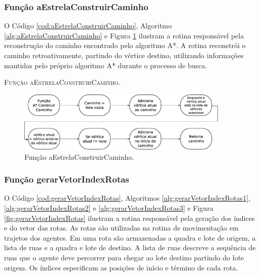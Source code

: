 \newpage

\subsubsection{Função aEstrelaConstruirCaminho}

O Código \ref{cod:aEstrelaConstruirCaminho}, Algoritmo \ref{alg:aEstrelaConstruirCaminho} e Figura \ref{fig:aEstrelaConstruirCaminho} ilustram a rotina responsável pela reconstrução do caminho encontrado pelo algoritmo A*. A rotina reconstrói o caminho retroativamente, partindo do vértice destino, utilizando informações mantidas pelo próprio algoritmo A* durante o processo de busca.



\begin{algorithm}[H]
   \SetAlgoLined
   
   \caption{\textsc{Função aEstrelaConstruirCaminho.}}
   \label{alg:aEstrelaConstruirCaminho}
\end{algorithm}

\begin{figure}[H]
  \centering
  \includegraphics[width=0.9\textwidth]{Figuras/Simula/Fluxos/aEstrelaConstruirCaminho.eps}
  \caption{Função aEstrelaConstruirCaminho.}
  \label{fig:aEstrelaConstruirCaminho}
\end{figure} 

\newpage

\subsubsection{Função gerarVetorIndexRotas}

O Código \ref{cod:gerarVetorIndexRotas}, Algoritmos \ref{alg:gerarVetorIndexRotas1}, \ref{alg:gerarVetorIndexRotas2} e \ref{alg:gerarVetorIndexRotas3} e Figura \ref{fig:gerarVetorIndexRotas} ilustram a rotina responsável pela geração dos índices e do vetor das rotas. As rotas são utilizadas na rotina de movimentação em trajetos dos agentes. Em uma rota são armazenadas a quadra e lote de origem, a lista de ruas e a quadra e lote de destino. A lista de ruas descreve a sequência de ruas que o agente deve percorrer para chegar ao lote destino partindo do lote origem. Os índices especificam as posições de início e término de cada rota. 

